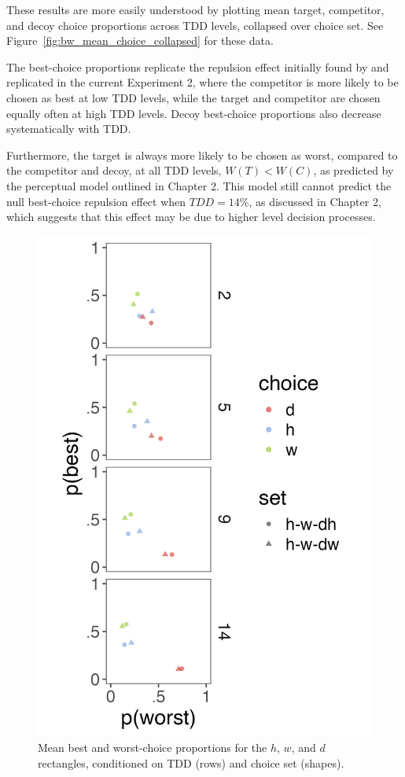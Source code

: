 These results are more easily understood by plotting mean target, competitor, and decoy choice proportions across TDD levels, collapsed over choice set. See Figure~\ref{fig:bw_mean_choice_collapsed} for these data. 

The best-choice proportions replicate the repulsion effect initially found by \textcite{spektorWhenGoodLooks2018b} and replicated in the current Experiment 2, where the competitor is more likely to be chosen as best at low TDD levels, while the target and competitor are chosen equally often at high TDD levels. Decoy best-choice proportions also decrease systematically with TDD. 

Furthermore, the target is always more likely to be chosen as worst, compared to the competitor and decoy, at all TDD levels, $W(T)<W(C)$, as predicted by the perceptual model outlined in Chapter 2. This model still cannot predict the null best-choice repulsion effect when $TDD=14\%$, as discussed in Chapter 2, which suggests that this effect may be due to higher level decision processes.

\begin{figure}
   \includegraphics[width=\linewidth]{figures/crit_mean_choice_by_set_dist_labelHW.jpeg}
   \caption{Mean best and worst-choice proportions for the $h$, $w$, and $d$ rectangles, conditioned on TDD (rows) and choice set (shapes).}
   \label{fig:bw_mean_choice_by_set}
\end{figure}

